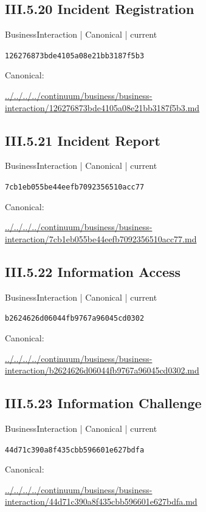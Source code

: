 \documentclass[10pt,a4paper]{article}
\begin{document}
\subsection*{III.5.20 Incident Registration}
\label{element-126276873bde4105a08e21bb3187f5b3}
{\small BusinessInteraction | Canonical | current}\par
\texttt{126276873bde4105a08e21bb3187f5b3}\par
Canonical: \par
{\footnotesize\url{../../../../continuum/business/business-interaction/126276873bde4105a08e21bb3187f5b3.md}}\par
\subsection*{III.5.21 Incident Report}
\label{element-7cb1eb055be44eefb7092356510acc77}
{\small BusinessInteraction | Canonical | current}\par
\texttt{7cb1eb055be44eefb7092356510acc77}\par
Canonical: \par
{\footnotesize\url{../../../../continuum/business/business-interaction/7cb1eb055be44eefb7092356510acc77.md}}\par
\subsection*{III.5.22 Information Access}
\label{element-b2624626d06044fb9767a96045cd0302}
{\small BusinessInteraction | Canonical | current}\par
\texttt{b2624626d06044fb9767a96045cd0302}\par
Canonical: \par
{\footnotesize\url{../../../../continuum/business/business-interaction/b2624626d06044fb9767a96045cd0302.md}}\par
\subsection*{III.5.23 Information Challenge}
\label{element-44d71c390a8f435cbb596601e627bdfa}
{\small BusinessInteraction | Canonical | current}\par
\texttt{44d71c390a8f435cbb596601e627bdfa}\par
Canonical: \par
{\footnotesize\url{../../../../continuum/business/business-interaction/44d71c390a8f435cbb596601e627bdfa.md}}\par
\end{document}
